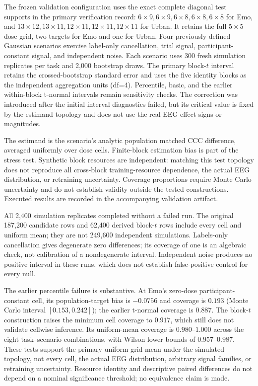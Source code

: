 The frozen validation configuration uses the exact complete diagonal test
supports in the primary verification record: $6\times9,6\times9,6\times8,
6\times8,6\times8$ for Emo, and $13\times12,13\times11,12\times11,
12\times11,12\times11$ for Urban. It retains the full $5\times5$ dose grid,
two targets for Emo and one for Urban. Four previously defined Gaussian
scenarios exercise label-only cancellation, trial signal, participant-constant
signal, and independent noise. Each scenario uses 300 fresh simulation
replicates per task and 2,000 bootstrap draws. The primary block-$t$ interval
retains the crossed-bootstrap standard error and uses the five identity blocks
as the independent aggregation units (df=4). Percentile, basic, and the earlier
within-block t-normal intervals remain sensitivity checks. The correction was
introduced after the initial interval diagnostics failed, but its critical
value is fixed by the estimand topology and does not use the real EEG effect
signs or magnitudes.

The estimand is the scenario's analytic population matched CCC difference,
averaged uniformly over dose cells. Finite-block estimation bias is part of
the stress test. Synthetic block resources are independent: matching this
test topology does not reproduce all cross-block training-resource dependence,
the actual EEG distribution, or retraining uncertainty. Coverage proportions
require Monte Carlo uncertainty and do not establish validity outside the
tested constructions. Executed results are recorded in the accompanying
validation artifact.



All 2,400 simulation replicates completed without a failed run. The original
187,200 candidate rows and 62,400 derived block-$t$ rows include every cell and
uniform mean; they are not 249,600 independent simulations. Labels-only cancellation gives degenerate
zero differences; its coverage of one is an algebraic check, not calibration
of a nondegenerate interval. Independent noise produces no positive interval
in these runs, which does not establish false-positive control for every null.

The earlier percentile failure is substantive. At Emo's zero-dose
participant-constant cell, its population-target bias is $-0.0756$ and coverage
is $0.193$ (Monte Carlo interval $[0.153,0.242]$); the earlier t-normal coverage
is $0.887$. The block-$t$ construction raises the minimum cell coverage to
$0.917$, which still does not validate cellwise inference. Its uniform-mean
coverage is $0.980$--$1.000$ across the eight task--scenario combinations, with
Wilson lower bounds of $0.957$--$0.987$. These tests support the primary
uniform-grid mean under the simulated topology, not every cell, the actual EEG
distribution, arbitrary signal families, or retraining uncertainty. Resource
identity and descriptive paired differences do not depend on a nominal
significance threshold; no equivalence claim is made.
